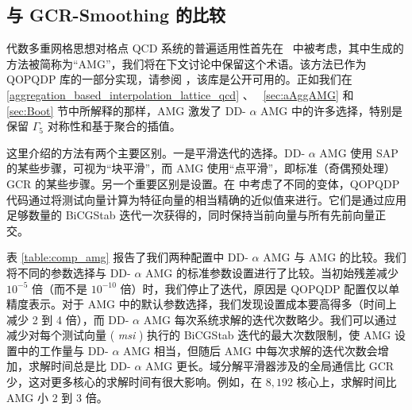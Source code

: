 \documentclass{siamltex}
\begin{document}
\subsection{与 GCR-Smoothing 的比较  }
\label{ss:gmres_smoother}    代数多重网格思想对格点 QCD 系统的普遍适用性首先在~    \cite{MGClark2010_1, MGClark2007, MGClark2010_2}    中被考虑，其中生成的方法被简称为“AMG”，我们将在下文讨论中保留这个术语。该方法已作为 QOPQDP 库的一部分实现，请参阅    \cite{wwwQOPQDP}    ，该库是公开可用的。正如我们在~    \ref{aggregation_based_interpolation_lattice_qcd}    、~    \ref{sec:aAggAMG}    和~    \ref{sec:Boot}    节中所解释的那样，AMG 激发了 DD-    $\alpha$    AMG 中的许多选择，特别是保留    $\Gamma_{5}$    对称性和基于聚合的插值。

这里介绍的方法有两个主要区别。一是平滑迭代的选择。DD-   $\alpha$    AMG 使用 SAP 的某些步骤，可视为“块平滑”，而 AMG 使用“点平滑”，即标准（奇偶预处理）GCR 的某些步骤。另一个重要区别是设置。在    \cite{MGClark2009, MGClark2010_1, MGClark2007, MGClark2010_2}    中考虑了不同的变体，QOPQDP 代码通过将测试向量计算为特征向量的相当精确的近似值来进行。它们是通过应用足够数量的 BiCGStab 迭代一次获得的，同时保持当前向量与所有先前向量正交。

表    \ref{table:comp_amg}    报告了我们两种配置中 DD-    $\alpha$    AMG 与 AMG 的比较。我们将不同的参数选择与 DD-    $\alpha$    AMG 的标准参数设置进行了比较。当初始残差减少    $10^{-5}$    倍（而不是    $10^{-10}$    倍）时，我们停止了迭代，原因是 QOPQDP 配置仅以单精度表示。对于 AMG 中的默认参数选择，我们发现设置成本要高得多（时间上减少 2 到 4 倍），而 DD-    $\alpha$    AMG 每次系统求解的迭代次数略少。我们可以通过减少对每个测试向量 (  {    \em    msi   }  ) 执行的 BiCGStab 迭代的最大次数限制，使 AMG 设置中的工作量与 DD-    $\alpha$    AMG 相当，但随后 AMG 中每次求解的迭代次数会增加，求解时间总是比 DD-    $\alpha$    AMG 更长。域分解平滑器涉及的全局通信比 GCR 少，这对更多核心的求解时间有很大影响。例如，在    $8,\!192$    核心上，求解时间比 AMG 小 2 到 3 倍。
\end{document}
